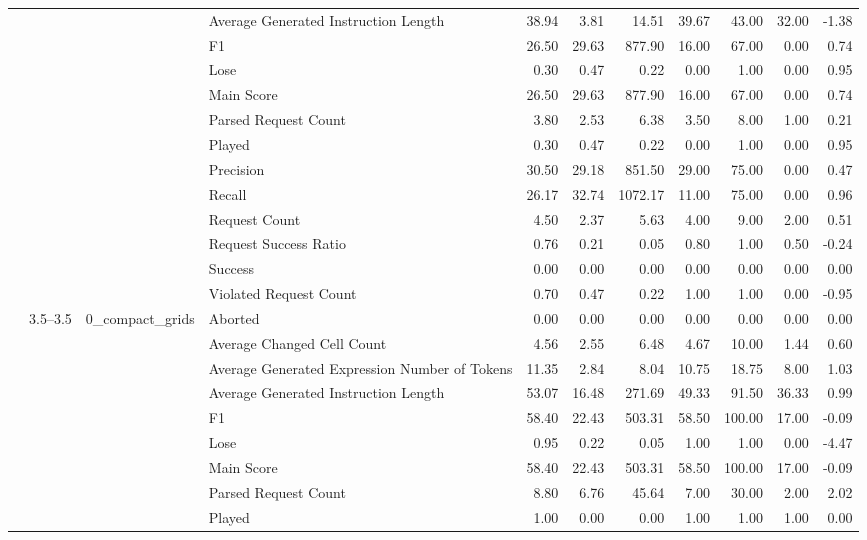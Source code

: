 \begin{tabular}{llllrrrrrrr}
 &  &  & Average Generated Instruction Length & 38.94 & 3.81 & 14.51 & 39.67 & 43.00 & 32.00 & -1.38 \\
 &  &  & F1 & 26.50 & 29.63 & 877.90 & 16.00 & 67.00 & 0.00 & 0.74 \\
 &  &  & Lose & 0.30 & 0.47 & 0.22 & 0.00 & 1.00 & 0.00 & 0.95 \\
 &  &  & Main Score & 26.50 & 29.63 & 877.90 & 16.00 & 67.00 & 0.00 & 0.74 \\
 &  &  & Parsed Request Count & 3.80 & 2.53 & 6.38 & 3.50 & 8.00 & 1.00 & 0.21 \\
 &  &  & Played & 0.30 & 0.47 & 0.22 & 0.00 & 1.00 & 0.00 & 0.95 \\
 &  &  & Precision & 30.50 & 29.18 & 851.50 & 29.00 & 75.00 & 0.00 & 0.47 \\
 &  &  & Recall & 26.17 & 32.74 & 1072.17 & 11.00 & 75.00 & 0.00 & 0.96 \\
 &  &  & Request Count & 4.50 & 2.37 & 5.63 & 4.00 & 9.00 & 2.00 & 0.51 \\
 &  &  & Request Success Ratio & 0.76 & 0.21 & 0.05 & 0.80 & 1.00 & 0.50 & -0.24 \\
 &  &  & Success & 0.00 & 0.00 & 0.00 & 0.00 & 0.00 & 0.00 & 0.00 \\
 &  &  & Violated Request Count & 0.70 & 0.47 & 0.22 & 1.00 & 1.00 & 0.00 & -0.95 \\
\cline{2-11} \cline{3-11}
 & \multirow[t]{30}{*}{3.5--3.5} & \multirow[t]{15}{*}{0_compact_grids} & Aborted & 0.00 & 0.00 & 0.00 & 0.00 & 0.00 & 0.00 & 0.00 \\
 &  &  & Average Changed Cell Count & 4.56 & 2.55 & 6.48 & 4.67 & 10.00 & 1.44 & 0.60 \\
 &  &  & Average Generated Expression Number of Tokens & 11.35 & 2.84 & 8.04 & 10.75 & 18.75 & 8.00 & 1.03 \\
 &  &  & Average Generated Instruction Length & 53.07 & 16.48 & 271.69 & 49.33 & 91.50 & 36.33 & 0.99 \\
 &  &  & F1 & 58.40 & 22.43 & 503.31 & 58.50 & 100.00 & 17.00 & -0.09 \\
 &  &  & Lose & 0.95 & 0.22 & 0.05 & 1.00 & 1.00 & 0.00 & -4.47 \\
 &  &  & Main Score & 58.40 & 22.43 & 503.31 & 58.50 & 100.00 & 17.00 & -0.09 \\
 &  &  & Parsed Request Count & 8.80 & 6.76 & 45.64 & 7.00 & 30.00 & 2.00 & 2.02 \\
 &  &  & Played & 1.00 & 0.00 & 0.00 & 1.00 & 1.00 & 1.00 & 0.00 \\

\end{tabular}
